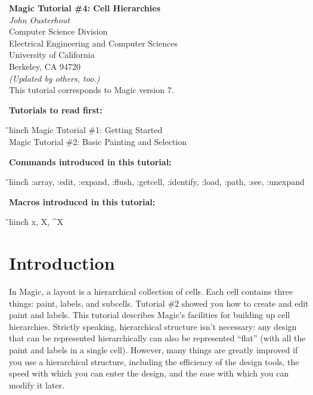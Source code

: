 \documentclass[letterpaper,twoside,12pt]{article}
\def\hinch{\hspace*{0.5in}}
\def\starti{\begin{center}\begin{tabbing}\hinch\=\hinch\=\hinch\=hinch\hinch\=\kill}
\def\endi{\end{tabbing}\end{center}}
\def\mytitle{Magic Tutorial \#4: Cell Hierarchies}
\begin{document}
\makeatletter
\newcommand{\ps@magic}{%
	\renewcommand{\@oddhead}{\mytitle\hfil\today}%
	\renewcommand{\@evenhead}{\today\hfil\mytitle}%
	\renewcommand{\@evenfoot}{\hfil\textrm{--{\thepage}--}\hfil}%
	\renewcommand{\@oddfoot}{\@evenfoot}}
\newcommand{\ps@mplain}{%
	\renewcommand{\@oddhead}{}%
	\renewcommand{\@evenhead}{}%
	\renewcommand{\@evenfoot}{\hfil\textrm{--{\thepage}--}\hfil}%
	\renewcommand{\@oddfoot}{\@evenfoot}}
\makeatother
\pagestyle{magic}
\thispagestyle{mplain}


\begin{center}
  {\bfseries \Large \mytitle} \\
  \vspace*{0.5in}
  {\itshape John Ousterhout} \\
  \vspace*{0.5in}
   Computer Science Division \\
   Electrical Engineering and Computer Sciences \\
   University of California \\
   Berkeley, CA  94720 \\
  \vspace*{0.25in}
  {\itshape (Updated by others, too.)} \\
  \vspace*{0.25in}
  This tutorial corresponds to Magic version 7. \\
\end{center}
\vspace*{0.5in}

{\noindent\bfseries\large Tutorials to read first:}
\starti
   \> Magic Tutorial \#1: Getting Started \\
   \> Magic Tutorial \#2: Basic Painting and Selection
\endi

{\noindent\bfseries\large Commands introduced in this tutorial:}
\starti
   \> :array, :edit, :expand, :flush, :getcell, :identify, :load, :path,
   :see, :unexpand
\endi

{\noindent\bfseries\large Macros introduced in this tutorial:}

\starti
   \> x, X, \^{}X
\endi

\vspace*{0.75in}
\section{Introduction}

In Magic, a layout is a hierarchical collection of cells.
Each cell contains three things: paint, labels, and
subcells.  Tutorial \#2 showed
you how to create and edit paint and labels.  This tutorial describes
Magic's facilities for building up cell hierarchies.  Strictly speaking,
hierarchical structure isn't necessary:  any design that can be
represented hierarchically can also be represented ``flat'' (with
all the paint and labels in a single cell).  However, many
things are greatly improved if you use a hierarchical
structure, including the
efficiency of the design tools, the speed with which you can enter
the design, and the ease with which you can modify it later.
\end{document}
